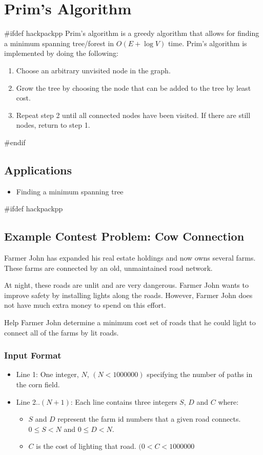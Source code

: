 \section{Prim's Algorithm}
#ifdef hackpackpp
Prim's algorithm is a greedy algorithm that allows for finding a minimum spanning tree/forest in $O(E + \log{V})$ time.
Prim's algorithm is implemented by doing the following:

\begin{enumerate}
	\item Choose an arbitrary unvisited node in the graph.
	\item Grow the tree by choosing the node that can be added to the tree by least cost.
	\item Repeat step 2 until all connected nodes have been visited. If there are still nodes, return to step 1.
\end{enumerate}

#endif
\subsection{Applications}
\begin{itemize}
	\item Finding a minimum spanning tree
\end{itemize}

#ifdef hackpackpp
\subsection{Example Contest Problem: Cow Connection}
Farmer John has expanded his real estate holdings and now owns several farms.
These farms are connected by an old, unmaintained road network. 

At night, these roads are unlit and are very dangerous.
Farmer John wants to improve safety by installing lights along the roads.
However, Farmer John does not have much extra money to spend on this effort.

Help Farmer John determine a minimum cost set of roads that he could light to connect all of the farms by lit roads.
\subsubsection{Input Format}
\begin{itemize}
\item Line 1: One integer, $N$, $(N < 1000000)$ specifying the number of paths in the corn field.
\item Line 2..$(N+1)$: Each line contains three integers $S$, $D$ and $C$ where:
	\begin{itemize}
		\item $S$ and $D$ represent the farm id numbers that a given road connects. $0 \leq S < N$ and $0 \leq D < N$.
		\item $C$ is the cost of lighting that road. $(0 < C < 1000000$
	\end{itemize}
\end{itemize}

